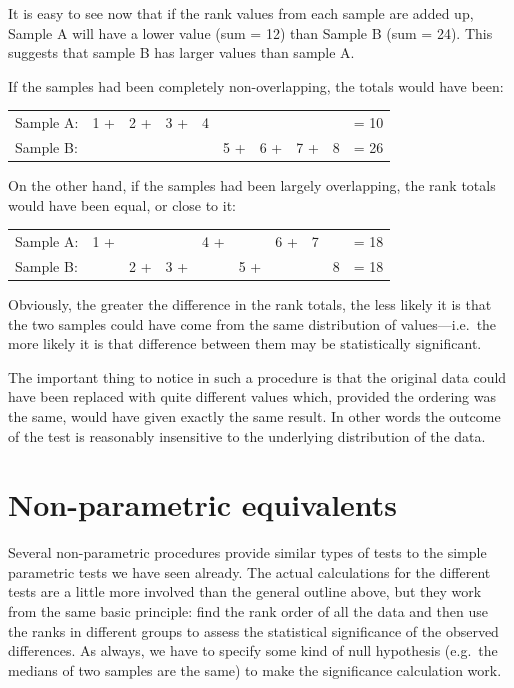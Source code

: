 \documentclass[
]{book}
\begin{document}
It is easy to see now that if the rank values from each sample are added up, Sample A will have a lower value (sum = 12) than Sample B (sum = 24). This suggests that sample B has larger values than sample A.

If the samples had been completely non-overlapping, the totals would have been:

\begin{longtable}[]{@{}lcccclllll@{}}
\toprule()
\endhead
Sample A: & 1 + & 2 + & 3 + & 4 & & & & & = 10 \\
Sample B: & & & & & 5 + & 6 + & 7 + & 8 & = 26 \\
\bottomrule()
\end{longtable}

On the other hand, if the samples had been largely overlapping, the rank totals would have been equal, or close to it:

\begin{longtable}[]{@{}lcllclccll@{}}
\toprule()
\endhead
Sample A: & 1 + & & & 4 + & & 6 + & 7 & & = 18 \\
Sample B: & & 2 + & 3 + & & 5 + & & & 8 & = 18 \\
\bottomrule()
\end{longtable}

Obviously, the greater the difference in the rank totals, the less likely it is that the two samples could have come from the same distribution of values---i.e.~the more likely it is that difference between them may be statistically significant.

The important thing to notice in such a procedure is that the original data could have been replaced with quite different values which, provided the ordering was the same, would have given exactly the same result. In other words the outcome of the test is reasonably insensitive to the underlying distribution of the data.

\hypertarget{non-parametric-equivalents}{%
\section{Non-parametric equivalents}\label{non-parametric-equivalents}}

Several non-parametric procedures provide similar types of tests to the simple parametric tests we have seen already. The actual calculations for the different tests are a little more involved than the general outline above, but they work from the same basic principle: find the rank order of all the data and then use the ranks in different groups to assess the statistical significance of the observed differences. As always, we have to specify some kind of null hypothesis (e.g.~the medians of two samples are the same) to make the significance calculation work.
\end{document}

